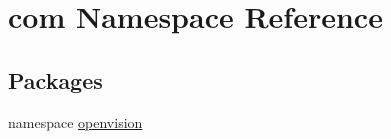 \hypertarget{namespacecom}{\section{com \-Namespace \-Reference}
\label{namespacecom}
}
\subsection*{\-Packages}
\begin{DoxyCompactItemize}
\item 
namespace \hyperlink{namespacecom_1_1openvision}{openvision}
\end{DoxyCompactItemize}
